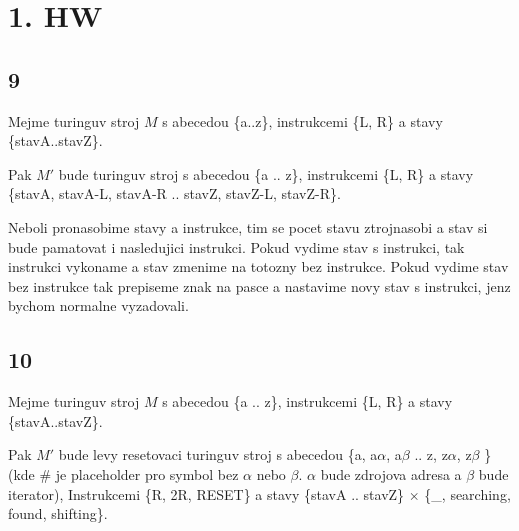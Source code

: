 \documentclass[a4paper]{article}
\begin{document}
\pagestyle{fancy}

\section*{1. HW}
\subsection*{9}
Mejme turinguv stroj $M$ s abecedou \{a..z\}, instrukcemi \{L, R\} a stavy \{stavA..stavZ\}.

Pak $M'$ bude turinguv stroj s abecedou \{a .. z\}, instrukcemi \{L, R\} a stavy \{stavA, stavA-L, stavA-R .. stavZ, stavZ-L, stavZ-R\}.  

Neboli pronasobime stavy a instrukce, tim se pocet stavu ztrojnasobi a stav si bude pamatovat i nasledujici instrukci.  
Pokud vydime stav s instrukci, tak instrukci vykoname a stav zmenime na totozny bez instrukce.
Pokud vydime stav bez instrukce tak prepiseme znak na pasce a nastavime novy stav s instrukci, jenz bychom normalne vyzadovali.

\subsection*{10}
Mejme turinguv stroj $M$ s abecedou \{a .. z\}, instrukcemi \{L, R\} a stavy \{stavA..stavZ\}.

Pak $M'$ bude levy resetovaci turinguv stroj s abecedou
\{a, a$\alpha$, a$\beta$ .. z, z$\alpha$, z$\beta$ \}
(kde \# je placeholder pro symbol bez $\alpha$ nebo $\beta$. $\alpha$ bude zdrojova adresa a $\beta$ bude iterator),
Instrukcemi \{R, 2R, RESET\} a stavy \{stavA .. stavZ\} $\times$ \{\_, searching, found, shifting\}.
\end{document}
